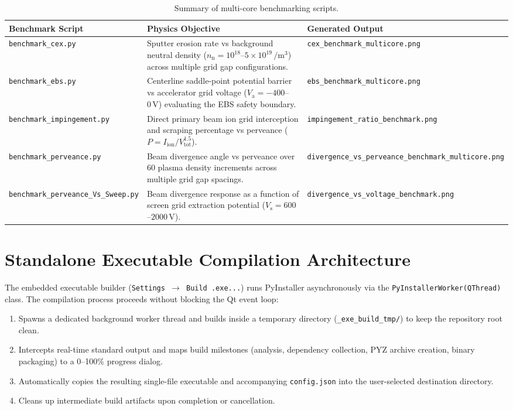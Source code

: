 \documentclass[11pt,a4paper]{article}
\begin{document}
\begin{table}[h!]
\centering
\small
\begin{tabular}{lp{6cm}p{4.5cm}}
\toprule
\textbf{Benchmark Script} & \textbf{Physics Objective} & \textbf{Generated Output} \\
\midrule
\texttt{benchmark\_cex.py} & Sputter erosion rate vs background neutral density ($n_{\mathrm{n}} = 10^{18}$--$5\times 10^{19}\,\si{\per\meter\cubed}$) across multiple grid gap configurations. & \texttt{cex\_benchmark\_multicore.png} \\
\addlinespace
\texttt{benchmark\_ebs.py} & Centerline saddle-point potential barrier vs accelerator grid voltage ($V_{\mathrm{a}} = -400$--$0\,\si{\volt}$) evaluating the EBS safety boundary. & \texttt{ebs\_benchmark\_multicore.png} \\
\addlinespace
\texttt{benchmark\_impingement.py} & Direct primary beam ion grid interception and scraping percentage vs perveance ($P = I_{\mathrm{ion}} / V_{\mathrm{tot}}^{1.5}$). & \texttt{impingement\_ratio\_benchmark.png} \\
\addlinespace
\texttt{benchmark\_perveance.py} & Beam divergence angle vs perveance over 60 plasma density increments across multiple grid gap spacings. & \texttt{divergence\_vs\_perveance\_benchmark\_multicore.png} \\
\addlinespace
\texttt{benchmark\_perveance\_Vs\_Sweep.py} & Beam divergence response as a function of screen grid extraction potential ($V_{\mathrm{s}} = 600$--$2000\,\si{\volt}$). & \texttt{divergence\_vs\_voltage\_benchmark.png} \\
\bottomrule
\end{tabular}
\caption{Summary of multi-core benchmarking scripts.}
\end{table}

\section{Standalone Executable Compilation Architecture}

The embedded executable builder (\texttt{Settings $\rightarrow$ Build .exe...}) runs PyInstaller asynchronously via the \texttt{PyInstallerWorker(QThread)} class. The compilation process proceeds without blocking the Qt event loop:
\begin{enumerate}[nosep]
    \item Spawns a dedicated background worker thread and builds inside a temporary directory (\texttt{\_exe\_build\_tmp/}) to keep the repository root clean.
    \item Intercepts real-time standard output and maps build milestones (analysis, dependency collection, PYZ archive creation, binary packaging) to a 0--100\% progress dialog.
    \item Automatically copies the resulting single-file executable and accompanying \texttt{config.json} into the user-selected destination directory.
    \item Cleans up intermediate build artifacts upon completion or cancellation.
\end{enumerate}
\end{document}
